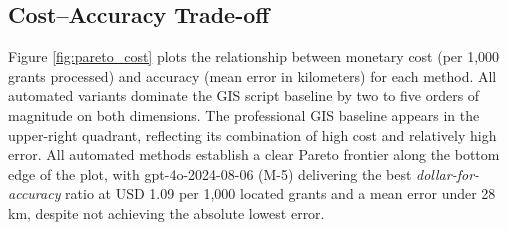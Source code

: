 \DIFdelbegin {}%


\DIFdelend \subsection{Cost--Accuracy Trade-off}\label{costaccuracy-trade-off}

Figure \ref{fig:pareto_cost} plots the relationship between monetary
cost (per 1,000 grants processed) and accuracy (mean error in
kilometers) for each method\DIFaddbegin {}\DIFaddend . All automated variants dominate the GIS script baseline
by two to five orders of magnitude on both dimensions. The professional
GIS baseline appears in the upper-right quadrant, reflecting its
combination of high cost and relatively high error. All automated
methods establish a clear Pareto frontier along the bottom edge of the
plot, with gpt-4o-2024-08-06 (M-5) delivering the best
\emph{dollar-for-accuracy} ratio at USD 1.09 per 1,000 located grants
and a mean error under 28 km, despite not achieving the absolute lowest
error.

